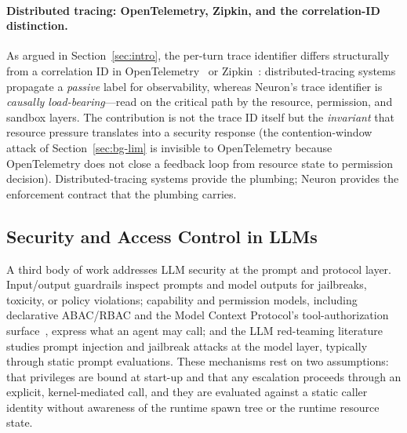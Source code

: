 \paragraph{Distributed tracing: OpenTelemetry, Zipkin, and the
correlation-ID distinction.}
As argued in Section~\ref{sec:intro}, the per-turn trace identifier
differs structurally from a correlation ID in OpenTelemetry~\cite{opentelemetry2024}
or Zipkin~\cite{zipkin2017}: distributed-tracing systems propagate a
\emph{passive} label for observability, whereas Neuron's trace
identifier is \emph{causally load-bearing}---read on the critical path
by the resource, permission, and sandbox layers. The contribution is
not the trace ID itself but the \emph{invariant} that resource pressure
translates into a security response (the contention-window attack of
Section~\ref{sec:bg-lim} is invisible to OpenTelemetry because
OpenTelemetry does not close a feedback loop from resource state to
permission decision). Distributed-tracing systems provide the
plumbing; Neuron provides the enforcement contract that the plumbing
carries.

\subsection{Security and Access Control in LLMs}
\label{sec:rw-sec}

A third body of work addresses LLM security at the prompt and protocol
layer. Input/output guardrails inspect prompts and model outputs for
jailbreaks, toxicity, or policy violations; capability and permission
models, including declarative ABAC/RBAC and the Model Context Protocol's
tool-authorization surface~\cite{anthropic2024mcp}, express what an agent
may call; and the LLM red-teaming literature~\cite{shen2024prompt} studies
prompt injection and jailbreak attacks at the model layer, typically through
static prompt evaluations. These mechanisms rest on two assumptions: that
privileges are bound at start-up and that any escalation proceeds through an
explicit, kernel-mediated call, and they are evaluated against a static
caller identity without awareness of the runtime spawn tree or the runtime
resource state.

